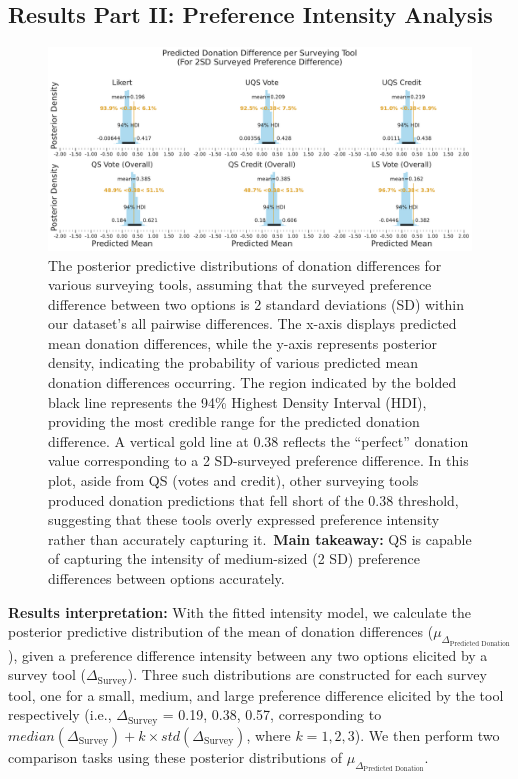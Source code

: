 \subsection{Results Part II: Preference Intensity Analysis}
\label{sec:result_2}

\begin{figure}[h]
    \centering
    \includegraphics[width=\textwidth]{content/image/intensity_2sd.pdf}
    \caption{
    The posterior predictive distributions of donation differences for various surveying tools, assuming that the surveyed preference difference between two options is 2 standard deviations (SD) within our dataset's all pairwise differences. The x-axis displays predicted mean donation differences, while the y-axis represents posterior density, indicating the probability of various predicted mean donation differences occurring. The region indicated by the bolded black line represents the 94\% Highest Density Interval (HDI), providing the most credible range for the predicted donation difference. A vertical gold line at 0.38 reflects the ``perfect'' donation value corresponding to a 2 SD-surveyed preference difference. In this plot, aside from QS (votes and credit), other surveying tools produced donation predictions that fell short of the 0.38 threshold, suggesting that these tools overly expressed preference intensity rather than accurately capturing it.~\textbf{Main takeaway:} QS is capable of capturing the intensity of medium-sized (2 SD) preference differences between options accurately.
    }
    \label{fig:donation_posterior}
\end{figure}


\textbf{Results interpretation:} With the fitted intensity model, we calculate the posterior predictive distribution of the mean of donation differences ($\mu_{\Delta_{\text{Predicted Donation}}}$), given a preference difference intensity between any two options elicited by a survey tool ($\Delta_{\text{Survey}}$). Three such distributions are constructed for each survey tool, one for a small, medium, and large preference difference elicited by the tool respectively (i.e., $\Delta_{\text{Survey}}$ = 0.19, 0.38, 0.57, corresponding to $median(\Delta_{\text{Survey}})+k \times std(\Delta_{\text{Survey}})$, where $k=1, 2, 3$). We then perform two comparison tasks using these posterior distributions of $\mu_{\Delta_{\text{Predicted Donation}}}$. 

